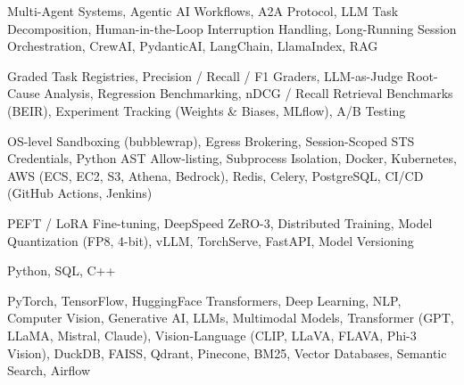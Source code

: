 \documentclass[letter,10pt]{article}
\begin{document}
 Multi-Agent Systems, Agentic AI Workflows, A2A Protocol, LLM Task Decomposition, Human-in-the-Loop Interruption Handling, Long-Running Session Orchestration, CrewAI, PydanticAI, LangChain, LlamaIndex, RAG\par\vspace{2pt}

 Graded Task Registries, Precision / Recall / F1 Graders, LLM-as-Judge Root-Cause Analysis, Regression Benchmarking, nDCG / Recall Retrieval Benchmarks (BEIR), Experiment Tracking (Weights \& Biases, MLflow), A/B Testing\par\vspace{2pt}

 OS-level Sandboxing (bubblewrap), Egress Brokering, Session-Scoped STS Credentials, Python AST Allow-listing, Subprocess Isolation, Docker, Kubernetes, AWS (ECS, EC2, S3, Athena, Bedrock), Redis, Celery, PostgreSQL, CI/CD (GitHub Actions, Jenkins)\par\vspace{2pt}

 PEFT / LoRA Fine-tuning, DeepSpeed ZeRO-3, Distributed Training, Model Quantization (FP8, 4-bit), vLLM, TorchServe, FastAPI, Model Versioning\par\vspace{2pt}

 Python, SQL, C++\par\vspace{2pt}

 PyTorch, TensorFlow, HuggingFace Transformers, Deep Learning, NLP, Computer Vision, Generative AI, LLMs, Multimodal Models, Transformer (GPT, LLaMA, Mistral, Claude), Vision-Language (CLIP, LLaVA, FLAVA, Phi-3 Vision), DuckDB, FAISS, Qdrant, Pinecone, BM25, Vector Databases, Semantic Search, Airflow
\end{document}

